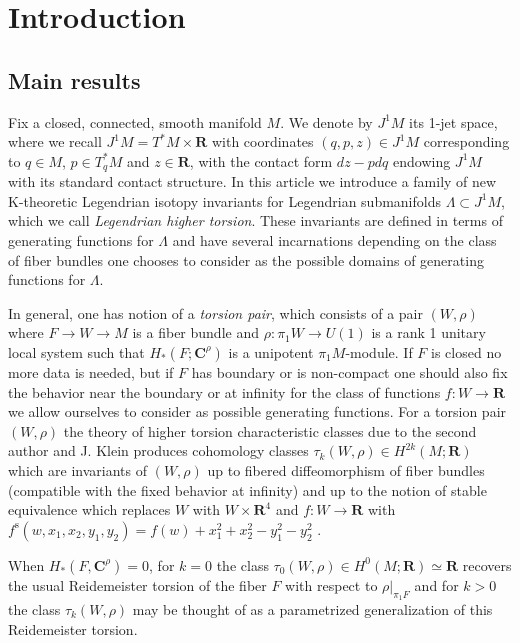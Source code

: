 \documentclass{amsart}
\def\bC{\mathbf{C}}
\def\bR{\mathbf{R}}
\theoremstyle{definition}
\theoremstyle{remark}
\newtheorem{inductive lemma}[theorem]{Inductive Lemma}
\begin{document}
 
 \onehalfspacing
 \tableofcontents
 
 \section{Introduction}\label{sec: intro}
 \subsection{Main results}\label{sec: main results}
 
 Fix a closed, connected, smooth manifold $M$. We denote by $J^1M$ its 1-jet space, where we recall $J^1M = T^*M \times \bR$ with coordinates $(q,p,z)\in J^1M$ corresponding to $q \in M$, $p \in T^*_qM$ and $z \in \bR$, with the contact form $dz-pdq$ endowing $J^1M$ with its standard contact structure. In this article we introduce a family of new K-theoretic Legendrian isotopy invariants for Legendrian submanifolds $\Lambda \subset J^1M$, which we call {\em Legendrian higher torsion}. These invariants are defined in terms of generating functions for $\Lambda$ and have several incarnations depending on the class of fiber bundles one chooses to consider as the possible domains of generating functions for $\Lambda$. 
 
 In general, one has notion of a {\em torsion pair}, which consists of a pair $(W,\rho)$ where $F \to W \to M$ is a fiber bundle and $\rho : \pi_1 W \to U(1)$ is a rank 1 unitary local system such that $H_*(F;\bC^\rho)$ is a unipotent $\pi_1M$-module. If $F$ is closed no more data is needed, but if $F$ has boundary or is non-compact one should also fix the behavior near the boundary or at infinity for the class of functions $f:W \to \bR$ we allow ourselves to consider as possible generating functions. For a torsion pair $(W,\rho)$ the theory of higher torsion characteristic classes due to the second author and J. Klein produces cohomology classes $\tau_k(W,\rho) \in H^{2k}(M;\bR)$ which are invariants of $(W,\rho)$ up to fibered diffeomorphism of fiber bundles (compatible with the fixed behavior at infinity) and up to the notion of stable equivalence which replaces $W$ with $W \times \bR^4$ and $f:W \to \bR$ with $f^{\text{s}}(w,x_1,x_2,y_1,y_2)=f(w)+x_1^2+x_2^2-y_1^2-y_2^2$ \cite{I02,I05,IK93a,IK93b,K89}. 
 
 When $H_*(F,\bC^\rho)=0$, for $k=0$ the class $\tau_0(W,\rho) \in H^0(M;\bR) \simeq \bR$ recovers the usual Reidemeister torsion of the fiber $F$ with respect to $\rho|_{\pi_1 F}$ and for $k>0$ the class $\tau_k(W,\rho)$ may be thought of as a parametrized generalization of this Reidemeister torsion. 
 
\end{document}
